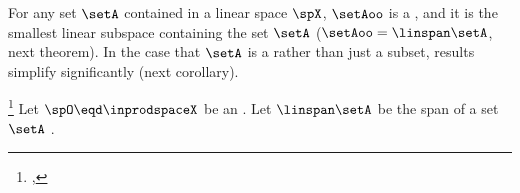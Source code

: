 For any set $\setA$ contained in a linear space $\spX$,
$\setAoo$ is a , and it
is the smallest linear subspace containing the set $\setA$ ($\setAoo=\linspan\setA$, next theorem).
In the case that $\setA$ is a  rather than just a subset,
results simplify significantly (next corollary).
\begin{theorem}
\footnote{
  ,
  }
\label{thm:inprod_orthog}
Let  $\spO\eqd\inprodspaceX$ be an  .
Let $\linspan\setA$ be the span of a set $\setA$ .
\end{theorem}
